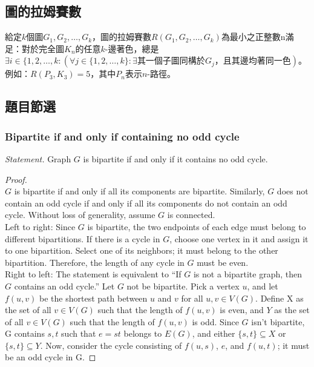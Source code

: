 \documentclass[a4paper,12pt]{report}
\begin{document}
\subsection{圖的拉姆賽數}
給定$k$個圖$G_1, G_2, \ldots, G_k$，圖的拉姆賽數$R(G_1, G_2, \ldots, G_k)$為最小之正整數n滿足：對於完全圖$K_n$的任意$k$-邊著色，總是\(\exists i \in \{1, 2, \ldots, k: (\forall j \in \{1, 2, \ldots, k\}: \exists \text{其一個子圖同構於$G_j$，且其邊均著同一色})\)。例如：$R(P_3, K_3) = 5$，其中$P_n$表示$n$-路徑。
\subsection{題目節選}
\subsubsection{Bipartite if and only if containing no odd cycle}
\textit{Statement. }Graph $G$ is bipartite if and only if it contains no odd cycle.
\begin{proof}\mbox{}\\
$G$ is bipartite if and only if all its components are bipartite. Similarly, $G$ does not contain an odd cycle if and only if all its components do not contain an odd cycle. Without loss of generality, assume $G$ is connected. \\
Left to right: Since $G$ is bipartite, the two endpoints of each edge must belong to different bipartitions. If there is a cycle in $G$, choose one vertex in it and assign it to one bipartition. Select one of its neighbors; it must belong to the other bipartition. Therefore, the length of any cycle in $G$ must be even. \\
Right to left: The statement is equivalent to ``If $G$ is not a bipartite graph, then $G$ contains an odd cycle.'' Let $G$ not be bipartite. Pick a vertex $u$, and let $f(u, v)$ be the shortest path between $u$ and $v$ for all $u, v \in V(G)$. Define X as the set of all $v \in V(G)$ such that the length of $f(u, v)$ is even, and $Y$ as the set of all $v \in V(G)$ such that the length of $f(u, v)$ is odd. Since $G$ isn't bipartite, G contains $s, t$ such that $e = st$ belongs to $E(G)$, and either $\{s, t\}\subseteq X$ or $\{s, t\}\subseteq Y$. Now, consider the cycle consisting of $f(u, s)$, $e$, and $f(u, t)$; it must be an odd cycle in G.
\end{proof}
\end{document}

